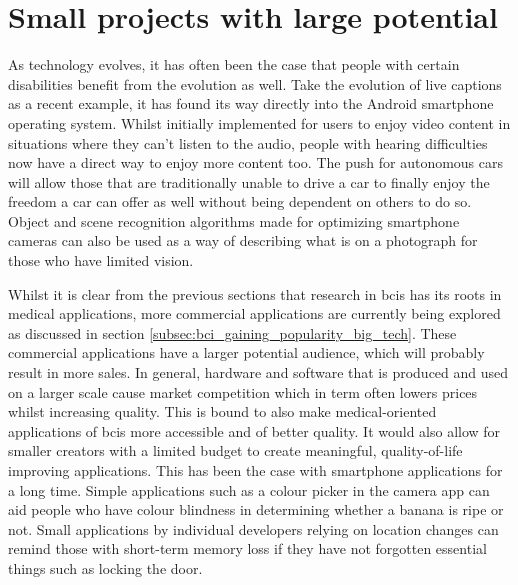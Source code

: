 
\section{Small projects with large potential}
\label{sec:bci_small_projects}

As technology evolves, it has often been the case that people with certain disabilities benefit from the evolution as well.
Take the evolution of live captions as a recent example, it has found its way directly into the Android smartphone operating system.
Whilst initially implemented for users to enjoy video content in situations where they can't listen to the audio, people with hearing difficulties now have a direct way to enjoy more content too.
The push for autonomous cars will allow those that are traditionally unable to drive a car to finally enjoy the freedom a car can offer as well without being dependent on others to do so.
Object and scene recognition algorithms made for optimizing smartphone cameras can also be used as a way of describing what is on a photograph for those who have limited vision.

Whilst it is clear from the previous sections that research in \glspl{bci} has its roots in medical applications, more commercial applications are currently being explored as discussed in section \ref{subsec:bci_gaining_popularity_big_tech}.
These commercial applications have a larger potential audience, which will probably result in more sales.
In general, hardware and software that is produced and used on a larger scale cause market competition which in term often lowers prices whilst increasing quality.
This is bound to also make medical-oriented applications of \glspl{bci} more accessible and of better quality.
It would also allow for smaller creators with a limited budget to create meaningful, quality-of-life improving applications.
This has been the case with smartphone applications for a long time.
Simple applications such as a colour picker in the camera app can aid people who have colour blindness in determining whether a banana is ripe or not.
Small applications by individual developers relying on location changes can remind those with short-term memory loss if they have not forgotten essential things such as locking the door.


